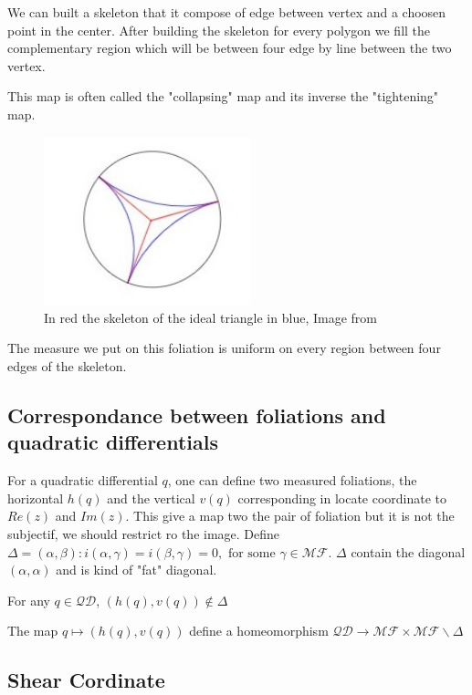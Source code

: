We can built a skeleton that it compose of edge between vertex and a choosen point in the center. After building the skeleton for every polygon we fill the complementary region which will be between four edge by line between the two vertex.

This map is often called the "collapsing" map and its inverse the "tightening" map.
%
\begin{figure}[h!]
\centering
\includegraphics[width=6cm]{Image/CollapsingTightening.jpg}
\caption{In red the skeleton of the ideal triangle in blue, Image from \cite{wright2018mirzakhani}}
\end{figure}

The measure we put on this foliation is uniform on every region between four edges of the skeleton.
\subsection{Correspondance between foliations and quadratic differentials}

For a quadratic differential $q$, one can define two measured foliations, the horizontal $h(q)$ and the vertical $v(q)$ corresponding in locate coordinate to $Re(z)$ and $Im(z)$. This give a map two the pair of foliation but it is not the subjectif, we should restrict ro the image.
Define $\Delta = {(\alpha,\beta):i(\alpha,\gamma)=i(\beta,\gamma)=0, \text{ for some }\gamma \in \mathcal{MF}}$. $\Delta$ contain the diagonal $(\alpha,\alpha)$ and is kind of "fat" diagonal.

\begin{lem}
For any $q \in \mathcal{QD}$, $(h(q),v(q)) \notin \Delta$
\end{lem}

\begin{thm}
The map $q \mapsto (h(q),v(q))$ define a homeomorphism $\mathcal{QD} \to \mathcal{MF} \times \mathcal{MF} \backslash \Delta$
\end{thm}

\subsection{Shear Cordinate}


